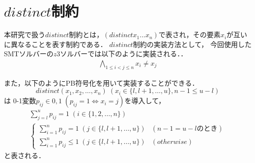 \section{$distinct$制約}


本研究で扱う$distinct$制約とは，$(distinct x_1 ... x_n)$で表され，その要素$x_i$が互いに異なることを表す制約である．
$distinct$制約の実装方法として，
今回使用したSMTソルバーの$z3ソルバー$では以下のように実装される．．
\begin{eqnarray*}
    \bigwedge_{1 \leq i < j \leq n} x_i \neq x_j
\end{eqnarray*}

また，以下のようにPB符号化を用いて実装することができる．
$$distinct(x_1, x_2,\ldots, x_n) \; (x_i \in \{l,l+1,\ldots,u\}, n-1 \leq u-l)$$
は
0-1変数$p_{ij} \in {0,1} \; (p_{ij}=1 \Leftrightarrow x_i=j)$を導入して，
\begin{eqnarray}
    \sum_{j=l}^{u} p_{ij}=1 \; (i \in \{1,2,\ldots,n\}) \label{eq:smt_pb_1}\\
    \begin{cases}
        \sum_{i=1}^{n} p_{ij} = 1 \; (j \in \{l,l+1,\ldots,u\}) & (n-1=u-lのとき) \\
        \sum_{i=1}^{n} p_{ij} \leq 1 \; (j \in \{l,l+1,\ldots,u\}) & (otherwise)
    \end{cases}\label{eq:smt_pb_2}
\end{eqnarray}
と表される．

